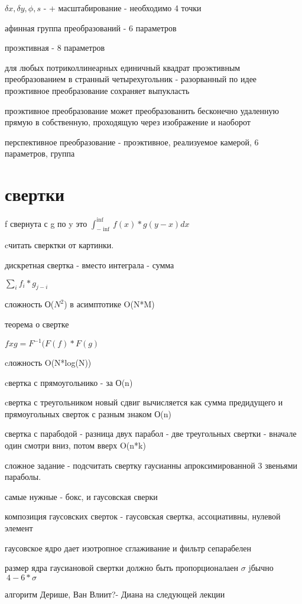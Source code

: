 \documentclass[]{report}
\begin{document}
$\delta x , \delta y, \phi , s$ - + масштабирование - необходимо 4 точки

афинная группа преобразований - 6 параметров

проэктивная - 8 параметров

для любых потриколлинеарных 
единичный квадрат проэктивным преобразованием в странный четырехугольник - разорванный
по идее проэктивное преобразование сохраняет выпукласть

проэктивное преобразование может преобразованить бесконечно удаленную прямую в собственную, проходящую через изображение и наоборот

перспективное преобразование - проэктивное, реализуемое камерой, 6 параметров, группа

\section{свертки}

f свернута с g по  y это $\int_{-\inf }^{\inf} f(x)*g(y-x) dx $

cчитать сверктки от картинки.

дискретная свертка - вместо интеграла - сумма

$\sum_i f_i* g_{j-i}$

сложность О($N^2$) в асимптотике O(N*M)

теорема о свертке

$fxg=F^{-1}(F(f)*F(g)$

cложность O(N*log(N))

cвертка с прямоугольнико - за О(n)

cвертка с треугольником 
новый сдвиг вычисляется как сумма предидущего и прямоугольных сверток с разным знаком О(n)

свертка с парабодой - разница двух парабол - две треугольных свертки - вначале один смотри вниз, потом вверх O(n*k)

сложное задание - подсчитать свертку гаусианны апроксимированной 3 звеньями параболы.


самые нужные - бокс, и гаусовская сверки

композиция гаусовских сверток - гаусовская свертка, ассоциативны, нулевой элемент 

гаусовское ядро дает изотропное сглаживание и фильтр сепарабелен

размер ядра гаусиановой свертки должно быть пропорционалаен $\sigma$
jбычно $~4-6*\sigma$

алгоритм Дерише, Ван Влиит?- Диана на следующей лекции
\end{document}
